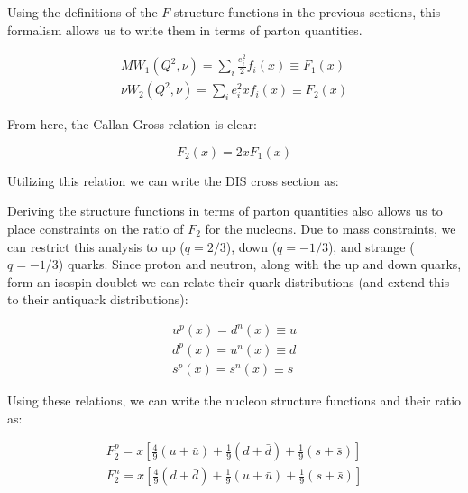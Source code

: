 Using the definitions of the $F$ structure functions in the previous sections, this formalism allows us to write them in terms of parton quantities.

\begin{subequations}
\begin{align}
	MW_1\left(Q^2,\nu\right) = \sum_i \frac{e_i^2}{2} f_i\left(x\right) \equiv F_1\left(x\right) \\
	\nu W_2\left(Q^2,\nu\right) = \sum_i e_i^2 x f_i\left(x\right) \equiv F_2\left(x\right)
\end{align}
\end{subequations}

From here, the Callan-Gross relation is clear:

\begin{equation}
	F_2\left(x\right) = 2xF_1\left(x\right)
\end{equation}

Utilizing this relation we can write the DIS cross section as:

Deriving the structure functions in terms of parton quantities also allows us to place constraints on the ratio of $F_2$ for the nucleons. Due to mass constraints, we can restrict this analysis to up ($q=2/3$), down ($q=-1/3$), and strange ($q=-1/3$) quarks. Since proton and neutron, along with the up and down quarks, form an isospin doublet we can relate their quark distributions (and extend this to their antiquark distributions):

\begin{subequations}
\begin{align}
	u^p\left(x\right) = d^n\left(x\right) \equiv u \\
	d^p\left(x\right) = u^n\left(x\right) \equiv d \\
	s^p\left(x\right) = s^n\left(x\right) \equiv s 
\end{align}
\end{subequations}

Using these relations, we can write the nucleon structure functions and their ratio as:

\begin{subequations}
\begin{align}
	F_2^p = x\left[\frac{4}{9}\left(u+\bar{u}\right) + \frac{1}{9}\left(d+\bar{d}\right) + \frac{1}{9}\left(s+\bar{s}\right)\right] \\
	F_2^n = x\left[\frac{4}{9}\left(d+\bar{d}\right) + \frac{1}{9}\left(u+\bar{u}\right) + \frac{1}{9}\left(s+\bar{s}\right)\right]
\end{align}
\end{subequations}

